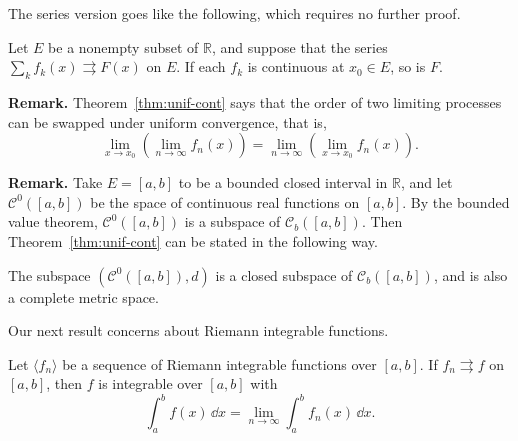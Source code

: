 \documentclass[11pt]{article}
\begin{document}
The series version goes like the following, which requires no further proof.

\begin{cor}
  Let $E$ be a nonempty subset of $\mathbb{R}$, and suppose that the series $\displaystyle \sum_k f_k(x) \rightrightarrows F(x)$ on $E$.  If each $f_k$ is continuous at $x_0 \in E$, so is $F$.
\end{cor}

\noindent\textbf{Remark.} Theorem~\ref{thm:unif-cont} says that the order of two limiting processes can be swapped under uniform convergence, that is,
\[
  \lim_{x \to x_0} \left( \lim_{n \to \infty} f_n(x) \right) = \lim_{n \to \infty} \left( \lim_{x \to x_0} f_n(x) \right).
\]

\medskip
\noindent\textbf{Remark.} Take $E = [a,b]$ to be a bounded closed interval in $\mathbb{R}$, and let $\mathcal{C}^0([a,b])$ be the space of continuous real functions on $[a,b]$.
By the bounded value theorem, $\mathcal{C}^0([a,b])$ is a subspace of $\mathcal{C}_b([a,b])$.
Then Theorem~\ref{thm:unif-cont} can be stated in the following way.

\begin{cor}
  The subspace $(\mathcal{C}^0([a,b]), d)$ is a closed subspace of $\mathcal{C}_b([a,b])$, and is also a complete metric space.
\end{cor}

Our next result concerns about Riemann integrable functions.

\begin{thm}
  \label{thm:unif-int}
  Let $\langle f_n \rangle$ be a sequence of Riemann integrable functions over $[a,b]$.  If $f_n \rightrightarrows f$ on $[a,b]$, then $f$ is integrable over $[a,b]$ with
  \[
    \int_a^b f(x) \, \dd x = \lim_{n \to \infty} \int_a^b f_n(x) \, \dd x.
  \]
\end{thm}
\end{document}

